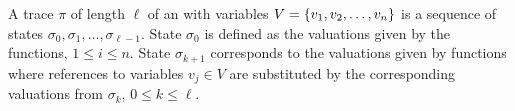 \begin{definition}
A trace $\pi$ of length $\ell$ of an \caig with variables 
$V=\{ v_1,v_2,\ldots,v_n \}$ is a sequence 
of \caig states $\sigma_0,\sigma_1,\ldots,\sigma_{\ell -1}$. 
State $\sigma_0$ is defined as the valuations given by 
the  functions, $1\le i \le n$. 
State $\sigma_{k+1}$ corresponds to the valuations 
given by functions  
where references to variables $v_j\in V$ are substituted by 
the corresponding valuations from $\sigma_{k}$, 
$0\le k \le \ell$. 
\end{definition}

